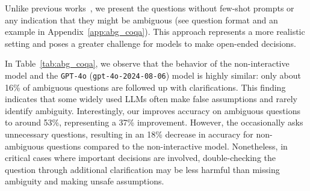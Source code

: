 Unlike previous works~\citep{abg_coqa, learn_to_clarify}, we present the questions without few-shot prompts or any indication that they might be ambiguous (see question format and an example in Appendix~\ref{app:abg_coqa}). This approach represents a more realistic setting and poses a greater challenge for models to make open-ended decisions.

In Table~\ref{tab:abg_coqa}, we observe that the behavior of the non-interactive \llama model and the \texttt{GPT-4o} (\texttt{gpt-4o-2024-08-06}) model is highly similar: only about 16\% of ambiguous questions are followed up with clarifications. This finding indicates that some widely used LLMs often make false assumptions and rarely identify ambiguity. Interestingly, our \object improves accuracy on ambiguous questions to around 53\%, representing a 37\% improvement. However, the \object occasionally asks unnecessary questions, resulting in an 18\% decrease in accuracy for non-ambiguous questions compared to the non-interactive model. Nonetheless, in critical cases where important decisions are involved, double-checking the question through additional clarification may be less harmful than missing ambiguity and making unsafe assumptions.

